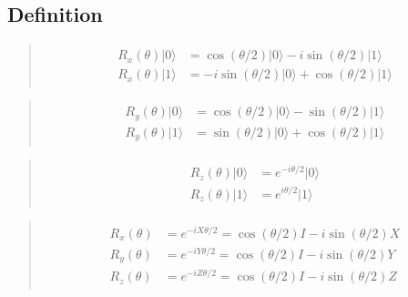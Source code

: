 \documentclass[letterpaper,10pt,english]{jupyterBook}
\begin{document}
\subsection{Definition}
\label{\detokenize{q1gates/r:definition}}
\sphinxAtStartPar
{}
\begin{quote}
\begin{equation*}
\begin{split}
\begin{align}
R_x(\theta)|0\rangle &= \cos(\theta/2)|0\rangle - i \sin(\theta/2) |1\rangle\\
R_x(\theta)|1\rangle &= -i \sin(\theta/2) |0\rangle + \cos(\theta/2) |1\rangle
\end{align}
\end{split}
\end{equation*}\end{quote}
\begin{quote}
\begin{equation*}
\begin{split}
\begin{align}
R_y(\theta)|0\rangle &= \cos(\theta/2)|0\rangle - \sin(\theta/2) |1\rangle\\
R_y(\theta)|1\rangle &= \sin(\theta/2) |0\rangle + \cos(\theta/2) |1\rangle
\end{align}
\end{split}
\end{equation*}\end{quote}
\begin{quote}
\begin{equation*}
\begin{split}
\begin{align}
R_z(\theta)|0\rangle &= e^{-i \theta/2} |0\rangle\\
R_z(\theta)|1\rangle &= e^{i \theta/2} |1\rangle
\end{align}
\end{split}
\end{equation*}\end{quote}

\sphinxAtStartPar
{}
\begin{quote}
\begin{equation*}
\begin{split}
\begin{align}
R_x(\theta) &= e^{-i X \theta/2} = \cos(\theta/2) I - i \sin(\theta/2) X\\
R_y(\theta) &= e^{-i Y \theta/2} = \cos(\theta/2) I - i \sin(\theta/2) Y\\
R_z(\theta) &= e^{-i Z \theta/2} = \cos(\theta/2) I - i \sin(\theta/2) Z
\end{align}
\end{split}
\end{equation*}\end{quote}
\end{document}

